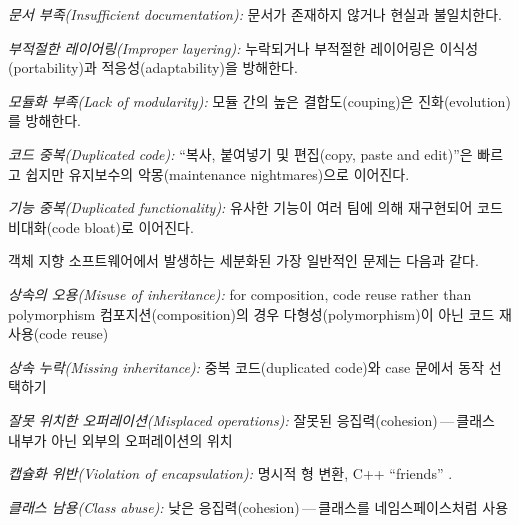 \documentclass[a4paper,10pt,twoside]{book}
\begin{document}
\begin{bulletlist}
  \item \emph{문서 부족(Insufficient documentation):}
  문서가 존재하지 않거나 현실과 불일치한다.

  \item \emph{부적절한 레이어링(Improper layering):}
  누락되거나 부적절한 레이어링은 이식성(portability)과 적응성(adaptability)을 방해한다.

  \item \emph{모듈화 부족(Lack of modularity):}
  모듈 간의 높은 결합도(couping)은 진화(evolution)를 방해한다.

  \item \emph{코드 중복(Duplicated code):}
  ``복사, 붙여넣기 및 편집(copy, paste and edit)''은 빠르고 쉽지만 유지보수의 악몽(maintenance nightmares)으로 이어진다.

  \item \emph{기능 중복(Duplicated functionality):}
  유사한 기능이 여러 팀에 의해 재구현되어 코드 비대화(code bloat)로 이어진다.
\end{bulletlist}

객체 지향 소프트웨어에서 발생하는 세분화된 가장 일반적인 문제는 다음과 같다.

\begin{bulletlist}
  \item \emph{상속의 오용(Misuse of inheritance):}
  for composition, code reuse rather than polymorphism
  컴포지션(composition)의 경우 다형성(polymorphism)이 아닌 코드 재사용(code reuse)

  \item \emph{상속 누락(Missing inheritance):}
  중복 코드(duplicated code)와 case 문에서 동작 선택하기 

  \item \emph{잘못 위치한 오퍼레이션(Misplaced operations):}
  잘못된 응집력(cohesion)\,---\,클래스 내부가 아닌 외부의 오퍼레이션의 위치

  \item \emph{캡슐화 위반(Violation of encapsulation):}
  명시적 형 변환, C++ ``friends'' . 

  \item \emph{클래스 남용(Class abuse):}
  낮은 응집력(cohesion)\,---\,클래스를 네임스페이스처럼 사용
\end{bulletlist}
\end{document}
